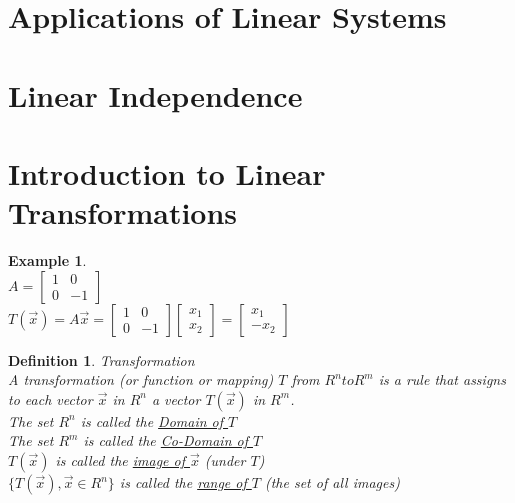 \documentclass[a4paper,12pt,openany]{book}
\theoremstyle{defn}
\newtheorem{defn}{Definition}[section]
\theoremstyle{expl}
\newtheorem{expl}{Example}[section]
\begin{document}
\section{Applications of Linear Systems}
\section{Linear Independence}
\section{Introduction to Linear Transformations}
\begin{expl}\-\\
\textup{
$A = \left[\begin{array}{cc}1&0\\0&-1\end{array}\right]$\\
$T(\vec{x})=A\vec{x}=\left[\begin{array}{cc}1&0\\0&-1\end{array}\right]\left[\begin{array}{c}x_1\\x_2\end{array}\right]=\left[\begin{array}{c}x_1\\-x_2\end{array}\right]$\\
}\end{expl}
\begin{defn}
\textup{
Transformation\\
A transformation (or function or mapping) $T$ from $R^n to R^m$ is a rule that assigns to each vector $\vec{x}$ in $R^n$ a vector $T(\vec{x})$ in $R^m$.\\
The set $R^n$ is called the \underline{Domain of $T$}\\
The set $R^m$ is called the \underline{Co-Domain of $T$}\\
$T(\vec{x})$ is called the \underline{image of $\vec{x}$} (under $T$)\\
$\{T(\vec{x}),\vec{x}\in R^n\}$ is called the \underline{range of $T$} (the set of all images)\\
}
\end{defn}
\end{document}
